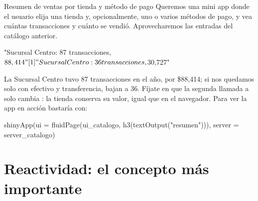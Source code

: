 \begin{ejemplo}{Resumen de ventas por tienda y método de pago}
Queremos una mini app donde el usuario elija una tienda y, opcionalmente,
uno o varios métodos de pago, y vea cuántas transacciones y cuánto se
vendió. Aprovecharemos las entradas del catálogo anterior.
\end{ejemplo}

\begin{rsalida}
[1] "Sucursal Centro: 87 transacciones, $88,414"
[1] "Sucursal Centro: 36 transacciones, $30,727"
\end{rsalida}

La Sucursal Centro tuvo 87 transacciones en el año, por \$88,414; si nos
quedamos solo con efectivo y transferencia, bajan a 36. Fíjate en que la segunda llamada a
 solo cambia : la tienda conserva su valor,
igual que en el navegador. Para ver la app en acción bastaría con:

\begin{rnoejecutar}
shinyApp(ui = fluidPage(ui_catalogo, h3(textOutput("resumen"))),
         server = server_catalogo)
\end{rnoejecutar}

\section{Reactividad: el concepto más importante}
\label{sec:m6-reactividad}

